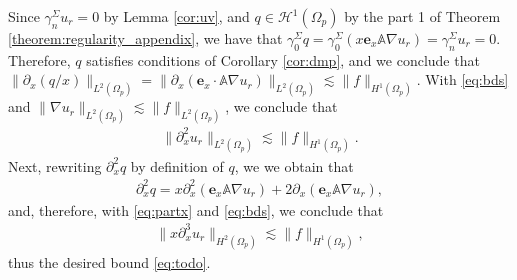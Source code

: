 \documentclass[report]{elsarticle}
\numberwithin{theorem}{section}
\renewcommand{\vec}[1]{\mathbf{#1}}
\begin{document}
Since $\gamma_n^{\Sigma}u_r=0$ by Lemma \ref{cor:uv}, and $q\in \mathcal{H}^1(\Omega_p)$ by the part 1 of Theorem \ref{theorem:regularity_appendix}, we have that $\gamma_0^{\Sigma}q=\gamma_0^{\Sigma}(x\vec{e}_x\mathbb{A}\nabla u_r)=\gamma_n^{\Sigma}u_r=0$. Therefore, $q$ satisfies conditions of Corollary \ref{cor:dmp}, and we conclude that $\|\partial_x(q/x)\|_{L^2(\Omega_p)}=\|\partial_x(\vec{e}_x\cdot \mathbb{A}\nabla u_r)\|_{L^2(\Omega_p)}\lesssim \|f\|_{H^1(\Omega_p)}$. With \eqref{eq:bds} and $\|\nabla u_r\|_{L^2(\Omega_p)}\lesssim \|f\|_{L^2(\Omega_p)}$, we conclude that 
\begin{align}
	\label{eq:partx}
	\|\partial_x^2 u_r\|_{L^2(\Omega_p)}\lesssim \|f\|_{H^1(\Omega_p)}.
\end{align}
Next, rewriting $\partial_x^2 q$ by definition of $q$, we we obtain that 
\begin{align*}
	\partial_x^2q=x\partial_x^2(\vec{e}_x\mathbb{A}\nabla u_r)+2\partial_x(\vec{e}_x\mathbb{A}\nabla u_r),
\end{align*}
and, therefore, with \eqref{eq:partx} and \eqref{eq:bds}, we conclude that 
\begin{align*}
	\|x\partial_x^3 u_r\|_{H^2(\Omega_p)}\lesssim \|f\|_{H^1(\Omega_p)},
\end{align*}
thus the desired bound \eqref{eq:todo}.
\end{document}
